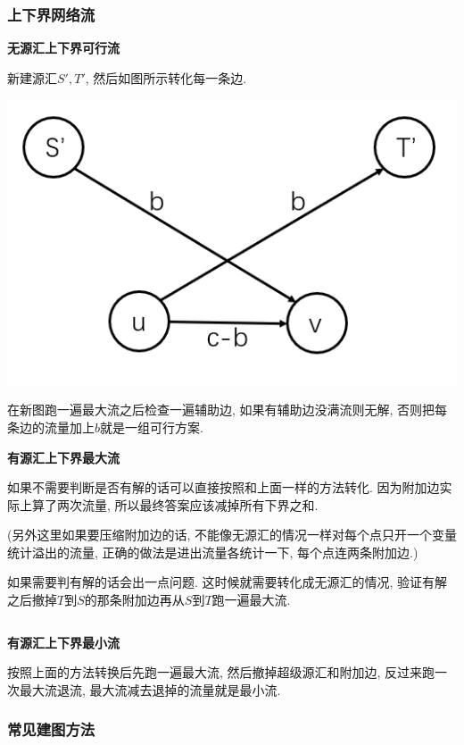 \subsubsection{上下界网络流}

\textbf{无源汇上下界可行流}

新建源汇$S', T'$, 然后如图所示转化每一条边.

\includegraphics[scale = 0.5]{../src/graph/上下界网络流.png}

在新图跑一遍最大流之后检查一遍辅助边, 如果有辅助边没满流则无解, 否则把每条边的流量加上$b$就是一组可行方案.

\textbf{有源汇上下界最大流}

如果不需要判断是否有解的话可以直接按照和上面一样的方法转化. 因为附加边实际上算了两次流量, 所以最终答案应该减掉所有下界之和.

(另外这里如果要压缩附加边的话, 不能像无源汇的情况一样对每个点只开一个变量统计溢出的流量, 正确的做法是进出流量各统计一下, 每个点连两条附加边.)

如果需要判有解的话会出一点问题. 这时候就需要转化成无源汇的情况, 验证有解之后撤掉$T$到$S$的那条附加边再从$S$到$T$跑一遍最大流.

\inputminted{cpp}{../src/graph/有源汇上下界最大流.cpp}

\textbf{有源汇上下界最小流}

按照上面的方法转换后先跑一遍最大流, 然后撤掉超级源汇和附加边, 反过来跑一次最大流退流, 最大流减去退掉的流量就是最小流.

\subsubsection{常见建图方法}

